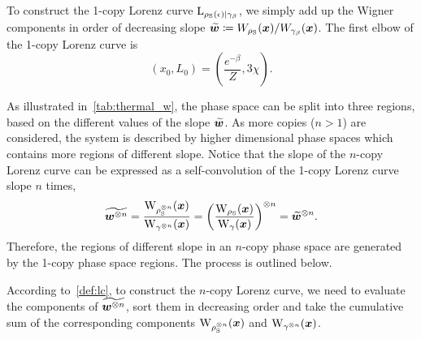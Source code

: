 \documentclass[pra,
aps,
twocolumn,
superscriptaddress,
groupedaddress,
nofootinbib,
reprint
]{revtex4-1}
\begin{document}
To construct the 1-copy Lorenz curve ${{\rm{L}}_{\rho_{\rm{S}}(\epsilon)|\gamma_\beta}}$, we simply add up the Wigner components in order of decreasing slope $\widetilde{\bm{w}} \coloneqq W_{\rho_{\rm{S}}}(\bm{x})/W_{\gamma_\beta}(\bm{x})$.
The first elbow of the 1-copy Lorenz curve is
\begin{equation}
	(x_0, L_0) = \left( \frac{e^{-\beta}}{Z}, 3\chi \right).
\end{equation}

As illustrated in~\cref{tab:thermal_w}, the phase space can be split into three regions, based on the different values of the slope $\widetilde{\bm{w}}$.
As more copies ($n>1$) are considered, the system is described by higher dimensional phase spaces which contains more regions of different slope.
Notice that the slope of the $n$-copy Lorenz curve can be expressed as a self-convolution of the 1-copy Lorenz curve slope $n$ times,
\begin{equation}
	\widetilde{\bmw\too{n}} = \frac{\W{\noisys\too{n}}(\bmx)}{\W{\gamma\too{n}}(\bmx)} = \left( \frac{\W{\noisys}(\bmx)}{\W{\gamma}(\bmx)} \right)\too{n} = \widetilde{\bmw}\too{n}.
\end{equation}
Therefore, the regions of different slope in an $n$-copy phase space are generated by the 1-copy phase space regions.
The process is outlined below.

According to~\cref{def:lc}, to construct the $n$-copy Lorenz curve, we need to evaluate the components of $\widetilde{\bm{w}^{\otimes n}}$, sort them in decreasing order and take the cumulative sum of the corresponding components $\W{\noisys\too{n}}(\bmx)$ and $\W{\gamma\too{n}}(\bmx)$.
\end{document}
